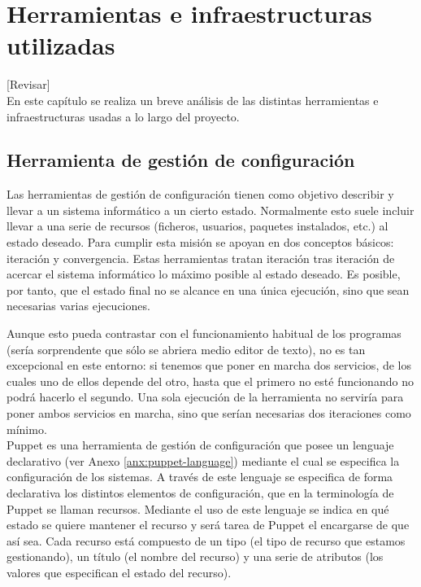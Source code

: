 \chapter{Herramientas e infraestructuras utilizadas}
\label{cap:herramientas}

[Revisar]\\

En este capítulo se realiza un breve análisis de las distintas herramientas e infraestructuras usadas a lo largo del proyecto.


\section{Herramienta de gestión de configuración}

Las herramientas de gestión de configuración tienen como objetivo describir y llevar a un sistema informático a un cierto estado. Normalmente esto suele incluir llevar a una serie de recursos (ficheros, usuarios, paquetes instalados, etc.) al estado deseado. Para cumplir esta misión se apoyan en dos conceptos básicos: iteración y convergencia. Estas herramientas tratan iteración tras iteración de acercar el sistema informático lo máximo posible al estado deseado. Es posible, por tanto, que el estado final no se alcance en una única ejecución, sino que sean necesarias varias ejecuciones.

Aunque esto pueda contrastar con el funcionamiento habitual de los programas (sería sorprendente que sólo se abriera medio editor de texto), no es tan excepcional en este entorno: si tenemos que poner en marcha dos servicios, de los cuales uno de ellos depende del otro, hasta que el primero no esté funcionando no podrá hacerlo el segundo. Una sola ejecución de la herramienta no serviría para poner ambos servicios en marcha, sino que serían necesarias dos iteraciones como mínimo. \\

Puppet \cite{puppetlabs} es una herramienta de gestión de configuración que posee un lenguaje declarativo (ver Anexo \ref{anx:puppet-language}) mediante el cual se especifica la configuración de los sistemas. A través de este lenguaje se especifica de forma declarativa los distintos elementos de configuración, que en la terminología de Puppet se llaman recursos. Mediante el uso de este lenguaje se indica en qué estado se quiere mantener el recurso y será tarea de Puppet el encargarse de que así sea. Cada recurso está compuesto de un tipo (el tipo de recurso que estamos gestionando), un título (el nombre del recurso) y una serie de atributos (los valores que especifican el estado del recurso). 

